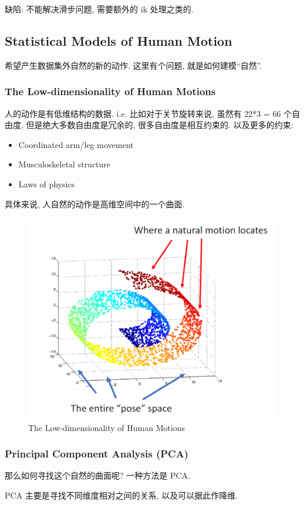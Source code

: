 缺陷: 不能解决滑步问题, 需要额外的 ik 处理之类的.

\subsection{Statistical Models of Human Motion}
希望产生数据集外自然的新的动作. 这里有个问题, 就是如何建模``自然''.

\subsubsection{The Low-dimensionality of Human Motions}
人的动作是有低维结构的数据. i.e. 比如对于关节旋转来说, 虽然有 22*3 = 66 个自由度, 但是绝大多数自由度是冗余的, 很多自由度是相互约束的. 以及更多的约束:
\begin{itemize}
    \item Coordinated arm/leg movement
    \item Musculoskeletal structure
    \item Laws of physics
\end{itemize}

具体来说, 人自然的动作是高维空间中的一个曲面. 
\begin{figure}[!htb]
    \centering
    \includegraphics[width=0.618\linewidth]{pic/1056/The Low-dimensionality of Human Motions}
    \caption{The Low-dimensionality of Human Motions}
\end{figure}


\subsubsection{Principal Component Analysis (PCA)}
那么如何寻找这个自然的曲面呢? 一种方法是 PCA.

PCA 主要是寻找不同维度相对之间的关系, 以及可以据此作降维. 

